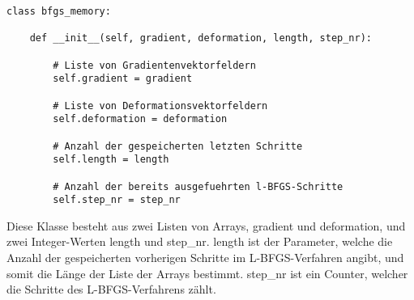 \begin{lstlisting}
class bfgs_memory:

    def __init__(self, gradient, deformation, length, step_nr):

        # Liste von Gradientenvektorfeldern
        self.gradient = gradient

        # Liste von Deformationsvektorfeldern
        self.deformation = deformation

        # Anzahl der gespeicherten letzten Schritte
        self.length = length

        # Anzahl der bereits ausgefuehrten l-BFGS-Schritte
        self.step_nr = step_nr
\end{lstlisting}

Diese Klasse besteht aus zwei Listen von Arrays, \textsf{gradient} und \textsf{deformation}, und zwei Integer-Werten \textsf{length} und \textsf{step\_nr}. 
\textsf{length} ist der Parameter, welche die Anzahl der gespeicherten vorherigen Schritte im L-BFGS-Verfahren angibt, und somit die Länge der Liste der Arrays bestimmt. \textsf{step\_nr} ist ein Counter, welcher die Schritte des L-BFGS-Verfahrens zählt. 

